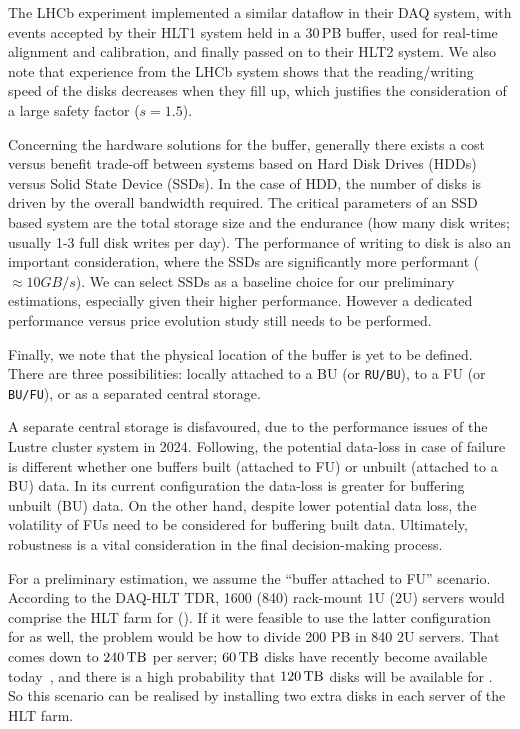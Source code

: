 The LHCb experiment implemented a similar dataflow in their DAQ system, with events accepted by their HLT1 system held in a 30\,PB buffer, used for real-time alignment and calibration, and finally passed on to their HLT2 system. We also note that experience from the LHCb system shows that the reading/writing speed of the disks decreases when they fill up, which justifies the consideration of a large safety factor ($s = 1.5$).

Concerning the hardware solutions for the buffer, generally there exists a cost versus benefit trade-off between systems based on Hard Disk Drives (HDDs) versus Solid State Device (SSDs). In the case of HDD, the number of disks is driven by the overall bandwidth required. The critical parameters of an SSD based system are the total storage size and the endurance (how many disk writes; usually 1-3 full disk writes per day). The performance of writing to disk is also an important consideration, where the SSDs are significantly more performant ($\approx 10 GB/s$). We can select SSDs as a baseline choice for our preliminary estimations, especially given their higher performance. However a dedicated performance versus price evolution study still needs to be performed.

Finally, we note that the physical location of the buffer is yet to be defined. There are three possibilities: 
locally attached to a BU (or \texttt{RU/BU}), to a FU (or \texttt{BU/FU}), or as a separated central storage.

A separate central storage is disfavoured, due to the performance issues of the Lustre cluster system in 2024. Following, the potential data-loss in case of failure is different whether one buffers built (attached to FU) or unbuilt (attached to a BU) data. In its current configuration the data-loss is greater for buffering unbuilt (BU) data. On the other hand, despite lower potential data loss, the volatility of FUs need to be considered for buffering built data. Ultimately, robustness is a vital consideration in the final decision-making process.

For a preliminary estimation, we assume the ``buffer attached to FU'' scenario.
According to the DAQ-HLT TDR,
1600 (840) rack-mount 1U (2U) servers would comprise the HLT farm for \Runfour (\Runfive).
If it were feasible to use the latter configuration for \Runfour as well,
the problem would be how to divide 200 PB in 840 2U servers.
That comes down to  $240\,\text{TB}$ per server; $60\,\text{TB}$ disks have recently become available today~\cite{micron60tb},
and there is a high probability that $120\,\text{TB}$ disks will be available for \Runfour. So this scenario can be realised by installing two extra disks in each server of the HLT farm.

